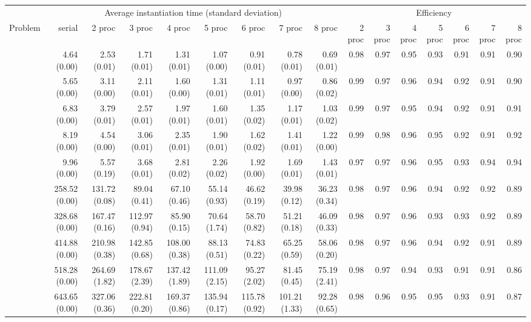 \documentclass[preprint]{tlp}
\begin{document}
\begin{landscape}

\scriptsize
\begin{tabular}{@{\extracolsep{\fill}}|c|r|r|r|r|r|r|r|r||r|r|r|r|r|r|r|}
\cline{1-16}
&\multicolumn{8}{c||}{Average instantiation time (standard deviation)}& \multicolumn{7}{c|}{Efficiency}\\
\cline{1-16}
Problem & serial & 2 proc  & 3 proc & 4 proc & 5 proc & 6 proc & 7 proc & 8 proc &  2 proc  & 3 proc & 4 proc & 5 proc & 6 proc & 7 proc & 8 proc\\
\cline{1-16}
 & 4.64 (0.00) & 2.53 (0.01) & 1.71 (0.01) & 1.31 (0.01) & 1.07 (0.00) & 0.91 (0.01) & 0.78 (0.01) & 0.69 (0.01)&0.98 & 0.97 & 0.95 & 0.93 & 0.91 & 0.91 & 0.90\\
 & 5.65 (0.00) & 3.11 (0.00) & 2.11 (0.01) & 1.60 (0.00) & 1.31 (0.01) & 1.11 (0.01) & 0.97 (0.00) & 0.86 (0.02)&0.99 & 0.97 & 0.96 & 0.94 & 0.92 & 0.91 & 0.90\\
 & 6.83 (0.00) & 3.79 (0.01) & 2.57 (0.01) & 1.97 (0.01) & 1.60 (0.01) & 1.35 (0.02) & 1.17 (0.01) & 1.03 (0.02)&0.99 & 0.97 & 0.95 & 0.94 & 0.92 & 0.91 & 0.91\\
 & 8.19 (0.00) & 4.54 (0.00) & 3.06 (0.01) & 2.35 (0.01) & 1.90 (0.01) & 1.62 (0.02) & 1.41 (0.01) & 1.22 (0.00)&0.99 & 0.98 & 0.96 & 0.95 & 0.92 & 0.91 & 0.92 \\
 &  9.96 (0.00) & 5.57 (0.19) & 3.68 (0.01) & 2.81 (0.02) & 2.26 (0.02) & 1.92 (0.00) & 1.69 (0.01) & 1.43 (0.01)&0.97 & 0.97 & 0.96 & 0.95 & 0.93 & 0.94 & 0.94 \\
\cline{1-16}
 & 258.52 (0.00) & 131.72 (0.08) & 89.04 (0.41) & 67.10 (0.46) & 55.14 (0.93) & 46.62 (0.19) & 39.98 (0.12) & 36.23 (0.34)& 0.98 & 0.97 & 0.96 & 0.94 & 0.92 & 0.92 & 0.89 \\
 & 328.68 (0.00) & 167.47 (0.16) & 112.97 (0.94) & 85.90 (0.15) & 70.64 (1.74) & 58.70 (0.82) & 51.21 (0.18) & 46.09 (0.33)& 0.98 & 0.97 & 0.96 & 0.93 & 0.93 & 0.92 & 0.89 \\
 & 414.88 (0.00) & 210.98 (0.38) & 142.85 (0.68) & 108.00 (0.38) & 88.13 (0.51) & 74.83 (0.22) & 65.25 (0.59) & 58.06 (0.20)& 0.98 & 0.97 & 0.96 & 0.94 & 0.92 & 0.91 & 0.89 \\
 & 518.28 (0.00) & 264.69 (1.82) & 178.67 (2.39) & 137.42 (1.89) & 111.09 (2.15) & 95.27 (2.02) & 81.45 (0.45) & 75.19 (2.41)& 0.98 & 0.97 & 0.94 & 0.93 & 0.91 & 0.91 & 0.86\\
 & 643.65 (0.00) & 327.06 (0.36) & 222.81 (0.20) & 169.37 (0.86) & 135.94 (0.17) & 115.78 (0.92) & 101.21 (1.33) & 92.28 (0.65)& 0.98 & 0.96 & 0.95 & 0.95 & 0.93 & 0.91 & 0.87 \\

\end{tabular}
\end{landscape}
\end{document}
